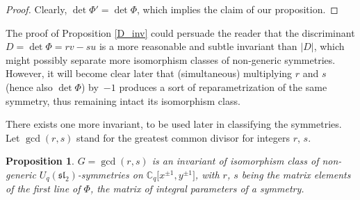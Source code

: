 \documentclass[10pt,a4paper]{amsart}
\numberwithin{equation}{section}
\newtheorem{Proposition}[Theorem]{Proposition}
 { \theoremstyle{definition}
\newtheorem{Definition}[Theorem]{Definition}
\newtheorem{Remark}[Theorem]{Remark} }
\begin{document}
\begin{proof}
Clearly, $\det\Phi'=\det\Phi$, which implies the claim of our proposition. \end{proof}

\begin{Remark}The proof of Proposition \ref{D_inv} could persuade the reader that the discriminant $D=\det\Phi=rv-su$ is a more reasonable and subtle invariant than $|D|$, which might possibly separate more isomorphism classes of non-generic symmetries. However, it will become clear later that (simultaneous) multiplying $r$ and $s$ (hence also $\det\Phi$) by~$-1$ produces a sort of reparametrization of the same symmetry, thus remaining intact its isomorphism class.
\end{Remark}

There exists one more invariant, to be used later in classifying the symmetries. Let $\operatorname{gcd}(r,s)$ stand for the greatest common divisor for integers $r$, $s$.

\begin{Proposition}$G=\operatorname{gcd}(r,s)$ is an invariant of isomorphism class of non-generic $U_q(\mathfrak{sl}_2)$-symmetries on $\mathbb{C}_q\big[x^{\pm 1},y^{\pm 1}\big]$, with $r$, $s$ being the matrix elements of the first line of $\Phi$, the matrix of integral parameters of a symmetry.
\end{Proposition}
\end{document}

